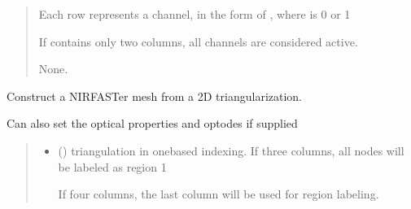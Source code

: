 \documentclass[letterpaper,10pt,english]{sphinxmanual}
\begin{document}
\begin{fulllineitems}
\begin{fulllineitems}
\begin{quote}
\begin{description}
\begin{itemize}
\sphinxAtStartPar
Each row represents a channel, in the form of , where  is 0 or 1

\sphinxAtStartPar
If  contains only two columns, all channels are considered active.


\end{itemize}

\sphinxAtStartPar
None.

\end{description}\end{quote}

\end{fulllineitems}


\begin{fulllineitems}
\label{\detokenize{_autosummary/nirfasterff.base.fluor_mesh.fluormesh:nirfasterff.base.fluor_mesh.fluormesh.from_triangle}}
\pysigstartsignatures
\pysiglinewithargsret
{}
{\sphinxparamcomma {}\sphinxparamcomma {}\sphinxparamcomma {}\sphinxparamcomma {}\sphinxparamcomma {}}
{}
\pysigstopsignatures
\sphinxAtStartPar
Construct a NIRFASTer mesh from a 2D triangularization.

\sphinxAtStartPar
Can also set the optical properties and optodes if supplied
\begin{quote}\begin{description}
\begin{itemize}
\item {} 
\sphinxAtStartPar
{} () \textendash{} 
\sphinxAtStartPar
triangulation in one\sphinxhyphen{}based indexing. If three columns, all nodes will be labeled as region 1

\sphinxAtStartPar
If four columns, the last column will be used for region labeling.



\end{itemize}
\end{description}
\end{quote}
\end{fulllineitems}
\end{fulllineitems}
\end{document}
